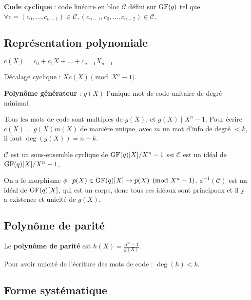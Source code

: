 \begin{defn}
	\textbf{Code cyclique} : code linéaire en bloc $\mathcal{C}$ défini sur $\mathrm{GF}(q)$ tel que $\forall c = (c_0,\ldots,c_{n - 1}) \in \mathcal{C}, (c_{n - 1},c_0,\ldots,c_{n - 2}) \in \mathcal{C}$.
\end{defn}

\subsection{Représentation polynomiale}

	\begin{defn}
		$c(X) = c_0 + c_1 X + \ldots + c_{n - 1} X_{n - 1}$
	\end{defn}

	Décalage cyclique : $X c(X) \pmod{X^n - 1}$.
	
	\begin{defn}
		\textbf{Polynôme générateur} : $g(X)$ l'unique mot de code unitaire de degré minimal.
	\end{defn}

	Tous les mots de code sont multiples de $g(X)$, et $g(X) \mid X^n - 1$.
	Pour écrire $c(X) = g(X) m(X)$ de manière unique, avec $m$ un mot d'info de degré $<  k$, il faut $\deg(g(X)) = n - k$.

	\begin{thm}
		$\mathcal{C}$ est un sous-ensemble cyclique de $\mathrm{GF}(q)[X] / X^n - 1$ ssi $\mathcal{C}$ est un idéal de $\mathrm{GF}(q)[X] / X^n - 1$.
	\end{thm}

	On a le morphisme $\phi \colon p(X) \in \mathrm{GF}(q)[X] \to p(X) \pmod{X^n - 1}$.
	$\phi^{-1}(\mathcal{C})$ est un idéal de $\mathrm{GF}(q)[X]$, qui est un corps, donc tous ces idéaux sont principaux et il y a existence et unicité de $g(X)$.


\subsection{Polynôme de parité}

	\begin{defn}
		Le \textbf{polynôme de parité} est $h(X) = \frac{X^n - 1}{g(X)}$.
	\end{defn}

	Pour avoir unicité de l'écriture des mots de code : $\deg(h) < k$.


\subsection{Forme systématique}

